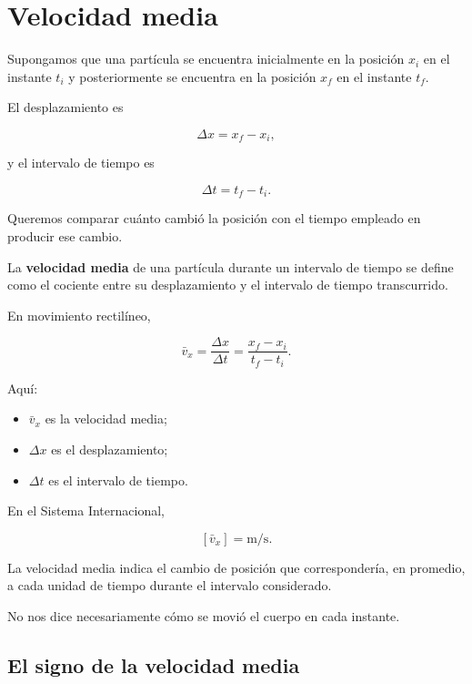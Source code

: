 \section{Velocidad media}

Supongamos que una partícula se encuentra inicialmente en la posición
\(x_i\) en el instante \(t_i\) y posteriormente se encuentra en la posición
\(x_f\) en el instante \(t_f\).

El desplazamiento es

\[ \Delta x=x_f-x_i, \]

y el intervalo de tiempo es

\[ \Delta t=t_f-t_i. \]

Queremos comparar cuánto cambió la posición con el tiempo empleado en
producir ese cambio.

\begin{definicion}
La \textbf{velocidad media} de una partícula durante un intervalo de tiempo
se define como el cociente entre su desplazamiento y el intervalo de tiempo
transcurrido.
\end{definicion}

En movimiento rectilíneo,

\[ \boxed{\bar{v}_x=\frac{\Delta x}{\Delta t}
=\frac{x_f-x_i}{t_f-t_i}}. \]

Aquí:

\begin{itemize}
    \item \(\bar{v}_x\) es la velocidad media;
    \item \(\Delta x\) es el desplazamiento;
    \item \(\Delta t\) es el intervalo de tiempo.
\end{itemize}

En el Sistema Internacional,

\[ [\bar{v}_x]=\si{\meter\per\second}. \]

\begin{interpretacion}
La velocidad media indica el cambio de posición que correspondería, en
promedio, a cada unidad de tiempo durante el intervalo considerado.

No nos dice necesariamente cómo se movió el cuerpo en cada instante.
\end{interpretacion}


\subsection{El signo de la velocidad media}

